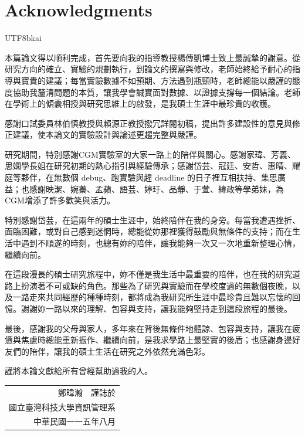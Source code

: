 \chapter*{Acknowledgments}
\begin{CJK}{UTF8}{bkai}

本篇論文得以順利完成，首先要向我的指導教授楊傳凱博士致上最誠摯的謝意。從研究方向的確立、實驗的規劃執行，到論文的撰寫與修改，老師始終給予耐心的指導與寶貴的建議；每當實驗數據不如預期、方法遇到瓶頸時，老師總能以嚴謹的態度協助我釐清問題的本質，讓我學會誠實面對數據、以證據支撐每一個結論。老師在學術上的傾囊相授與研究思維上的啟發，是我碩士生涯中最珍貴的收穫。

感謝口試委員林伯慎教授與賴源正教授撥冗詳閱初稿，提出許多建設性的意見與修正建議，使本論文的實驗設計與論述更趨完整與嚴謹。

研究期間，特別感謝CGM實驗室的大家一路上的陪伴與關心。感謝家瑋、芳義、思嫻學長姐在研究初期的熱心指引與經驗傳承；感謝岱芸、冠廷、安哲、惠晴、耀庭等夥伴，在無數個 debug、跑實驗與趕 deadline 的日子裡互相扶持、集思廣益；也感謝映潔、婉蓁、孟蘋、語芸、婷玗、品靜、于萱、緯政等學弟妹，為CGM增添了許多歡笑與活力。

特別感謝岱芸，在這兩年的碩士生涯中，始終陪伴在我的身旁。每當我遭遇挫折、面臨困難，或對自己感到迷惘時，總能從妳那裡獲得鼓勵與無條件的支持；而在生活中遇到不順遂的時刻，也總有妳的陪伴，讓我能夠一次又一次地重新整理心情，繼續向前。

在這段漫長的碩士研究旅程中，妳不僅是我生活中最重要的陪伴，也在我的研究道路上扮演著不可或缺的角色。那些為了研究與實驗而在學校度過的無數個夜晚，以及一路走來共同經歷的種種時刻，都將成為我研究所生涯中最珍貴且難以忘懷的回憶。謝謝妳一路以來的理解、包容與支持，讓我能夠堅持走到這段旅程的最後。

最後，感謝我的父母與家人，多年來在背後無條件地體諒、包容與支持，讓我在疲憊與焦慮時總能重新振作、繼續向前，是我求學路上最堅實的後盾；也感謝身邊好友們的陪伴，讓我的碩士生活在研究之外依然充滿色彩。

謹將本論文獻給所有曾經幫助過我的人。

\vspace{1.5em}
\begin{flushright}
\begin{tabular}{@{}r@{}}
鄭暐瀚　謹誌於\\
國立臺灣科技大學資訊管理系\\
中華民國一一五年八月
\end{tabular}
\end{flushright}
\end{CJK}
